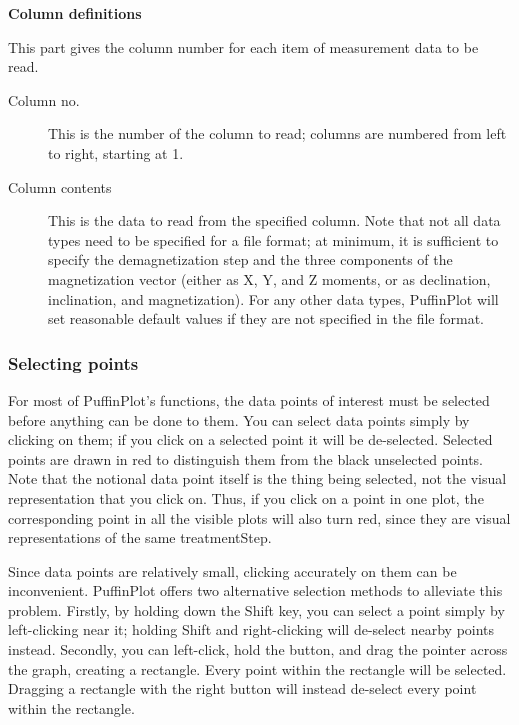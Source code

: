 \documentclass[a4paper,british]{article}
\newcommand{\ppcmd}[1]{\textsf{#1}} %
\newcommand{\mypara}[1]{\noindent\textbf{#1}

\noindent\ignorespaces} %
\begin{document}
\mypara{Column definitions} This part gives the column number for each
item of measurement data to be read.

\begin{description}

\item[Column no.] This is the number of the column to read; columns are
  numbered from left to right, starting at 1.

\item[Column contents] This is the data to read from the specified
  column. Note that not all data types need to be specified for a file
  format; at minimum, it is sufficient to specify the demagnetization
  step and the three components of the magnetization vector (either as
  X, Y, and Z moments, or as declination, inclination, and
  magnetization). For any other data types, PuffinPlot will set
  reasonable default values if they are not specified in the file
  format.

\end{description}

\subsubsection{Selecting points}

For most of PuffinPlot's functions, the data points of interest must be
selected before anything can be done to them. You can select data points
simply by clicking on them; if you click on a selected point it will be
de-selected. Selected points are drawn in red to distinguish them from the
black unselected points. Note that the notional data point itself is the
thing being selected, not the visual representation that you click on. Thus,
if you click on a point in one plot, the corresponding point in all the
visible plots will also turn red, since they are visual representations of
the same treatmentStep.

Since data points are relatively small, clicking accurately on them can be
inconvenient. PuffinPlot offers two alternative selection methods to
alleviate this problem. Firstly, by holding down the \ppcmd{Shift} key, you
can select a point simply by left-clicking near it; holding \ppcmd{Shift} and
right-clicking will de-select nearby points instead. Secondly, you can
left-click, hold the button, and drag the pointer across the graph, creating
a rectangle. Every point within the rectangle will be selected. Dragging a
rectangle with the right button will instead de-select every point within the
rectangle.
\end{document}
